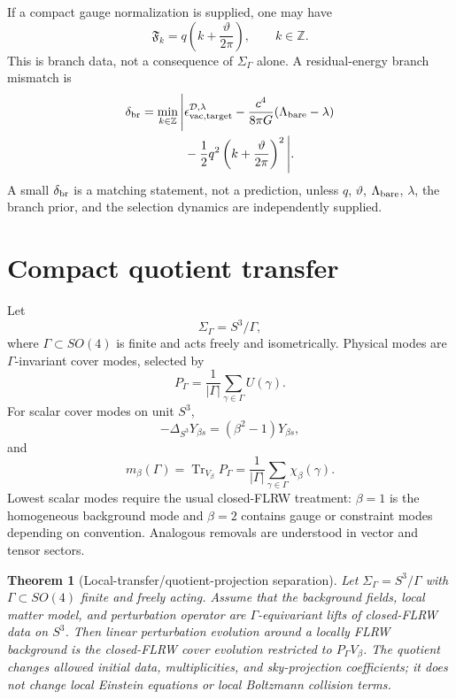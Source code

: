 \documentclass[
  aps,
  prd,
  reprint,
  superscriptaddress,
  floatfix,
  nofootinbib,
  longbibliography
]{revtex4-2}
\theoremstyle{plain}
\newtheorem{theorem}{Theorem}
\theoremstyle{definition}
\theoremstyle{remark}
\newcommand{\D}{\mathcal D}
\newcommand{\Tr}{\operatorname{Tr}}
\newcommand{\PG}{P_{\Gamma}}
\newcommand{\Fcal}{\mathfrak F}
\newcommand{\Z}{\mathbb Z}
\begin{document}
If a compact gauge normalization is supplied, one may have
\begin{equation}
\Fcal_k=q\left(k+\frac{\vartheta}{2\pi}\right),
\qquad
k\in\Z.
\label{eq:flux_branch}
\end{equation}
This is branch data, not a consequence of $\Sigma_\Gamma$ alone.  A residual-energy branch mismatch is
\begin{equation}
\begin{aligned}
\delta_{\rm br}=\min_{k\in\Z}\Bigg|&
\epsilon_{\rm vac,target}^{\D,\lambda}
-\frac{c^4}{8\pi G}(\Lambda_{\rm bare}-\lambda)\\
&-\frac12q^2\left(k+\frac{\vartheta}{2\pi}\right)^2
\Bigg| .
\end{aligned}
\label{eq:branch_spacing_defect}
\end{equation}
A small $\delta_{\rm br}$ is a matching statement, not a prediction, unless $q$, $\vartheta$, $\Lambda_{\rm bare}$, $\lambda$, the branch prior, and the selection dynamics are independently supplied.

\section{Compact quotient transfer}

Let
\begin{equation}
\Sigma_\Gamma=S^3/\Gamma,
\end{equation}
where $\Gamma\subset SO(4)$ is finite and acts freely and isometrically.  Physical modes are $\Gamma$-invariant cover modes, selected by
\begin{equation}
\boxed{
\PG=\frac1{|\Gamma|}\sum_{\gamma\in\Gamma}U(\gamma).}
\label{eq:projector}
\end{equation}
For scalar cover modes on unit $S^3$,
\begin{equation}
-\Delta_{S^3}Y_{\beta s}=(\beta^2-1)Y_{\beta s},
\end{equation}
and
\begin{equation}
m_\beta(\Gamma)=\Tr_{V_\beta}\PG
=\frac1{|\Gamma|}\sum_{\gamma\in\Gamma}\chi_\beta(\gamma).
\label{eq:multiplicity}
\end{equation}
Lowest scalar modes require the usual closed-FLRW treatment: $\beta=1$ is the homogeneous background mode and $\beta=2$ contains gauge or constraint modes depending on convention.  Analogous removals are understood in vector and tensor sectors.

\begin{theorem}[Local-transfer/quotient-projection separation]
Let $\Sigma_\Gamma=S^3/\Gamma$ with $\Gamma\subset SO(4)$ finite and freely acting.  Assume that the background fields, local matter model, and perturbation operator are $\Gamma$-equivariant lifts of closed-FLRW data on $S^3$.  Then linear perturbation evolution around a locally FLRW background is the closed-FLRW cover evolution restricted to $\PG V_\beta$.  The quotient changes allowed initial data, multiplicities, and sky-projection coefficients; it does not change local Einstein equations or local Boltzmann collision terms.
\end{theorem}
\end{document}
